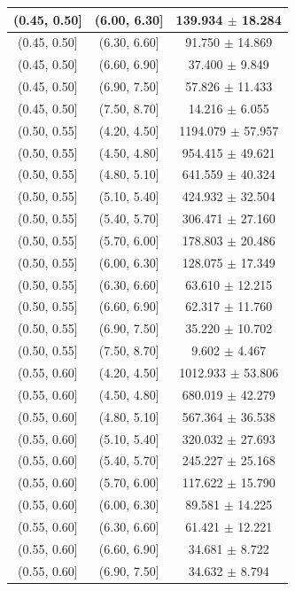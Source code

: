 \begin{longtable}{|c|c|c|}
\hline
(0.45, 0.50] & (6.00, 6.30] & 139.934 $\pm$ 18.284 \\ 
\hline
(0.45, 0.50] & (6.30, 6.60] & 91.750 $\pm$ 14.869 \\ 
\hline
(0.45, 0.50] & (6.60, 6.90] & 37.400 $\pm$ 9.849 \\ 
\hline
(0.45, 0.50] & (6.90, 7.50] & 57.826 $\pm$ 11.433 \\ 
\hline
(0.45, 0.50] & (7.50, 8.70] & 14.216 $\pm$ 6.055 \\ 
\hline
(0.50, 0.55] & (4.20, 4.50] & 1194.079 $\pm$ 57.957 \\ 
\hline
(0.50, 0.55] & (4.50, 4.80] & 954.415 $\pm$ 49.621 \\ 
\hline
(0.50, 0.55] & (4.80, 5.10] & 641.559 $\pm$ 40.324 \\ 
\hline
(0.50, 0.55] & (5.10, 5.40] & 424.932 $\pm$ 32.504 \\ 
\hline
(0.50, 0.55] & (5.40, 5.70] & 306.471 $\pm$ 27.160 \\ 
\hline
(0.50, 0.55] & (5.70, 6.00] & 178.803 $\pm$ 20.486 \\ 
\hline
(0.50, 0.55] & (6.00, 6.30] & 128.075 $\pm$ 17.349 \\ 
\hline
(0.50, 0.55] & (6.30, 6.60] & 63.610 $\pm$ 12.215 \\ 
\hline
(0.50, 0.55] & (6.60, 6.90] & 62.317 $\pm$ 11.760 \\ 
\hline
(0.50, 0.55] & (6.90, 7.50] & 35.220 $\pm$ 10.702 \\ 
\hline
(0.50, 0.55] & (7.50, 8.70] & 9.602 $\pm$ 4.467 \\ 
\hline
(0.55, 0.60] & (4.20, 4.50] & 1012.933 $\pm$ 53.806 \\ 
\hline
(0.55, 0.60] & (4.50, 4.80] & 680.019 $\pm$ 42.279 \\ 
\hline
(0.55, 0.60] & (4.80, 5.10] & 567.364 $\pm$ 36.538 \\ 
\hline
(0.55, 0.60] & (5.10, 5.40] & 320.032 $\pm$ 27.693 \\ 
\hline
(0.55, 0.60] & (5.40, 5.70] & 245.227 $\pm$ 25.168 \\ 
\hline
(0.55, 0.60] & (5.70, 6.00] & 117.622 $\pm$ 15.790 \\ 
\hline
(0.55, 0.60] & (6.00, 6.30] & 89.581 $\pm$ 14.225 \\ 
\hline
(0.55, 0.60] & (6.30, 6.60] & 61.421 $\pm$ 12.221 \\ 
\hline
(0.55, 0.60] & (6.60, 6.90] & 34.681 $\pm$ 8.722 \\ 
\hline
(0.55, 0.60] & (6.90, 7.50] & 34.632 $\pm$ 8.794 \\ 

\end{longtable}
